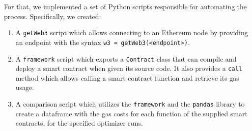 For that, we implemented a set of Python scripts responsible for automating the process. Specifically, we created:
\begin{enumerate}
  \item A \texttt{getWeb3} script which allows connecting to an Ethereum node by providing an endpoint with the syntax \texttt{w3 = getWeb3(<endpoint>)}.
  \item A \texttt{framework} script which exports a \texttt{Contract} class that can compile and deploy a smart contract when given its source code. It also provides a \texttt{call} method which allows calling a smart contract function and retrieve its gas usage. 
  \item A comparison script which utilizes the \texttt{framework} and the \texttt{pandas} library to create a dataframe with the gas costs for each function of the supplied smart contracts, for the specified optimizer runs.
\end{enumerate}